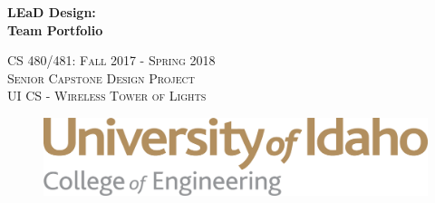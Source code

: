 \documentclass[12pt]{article}
\begin{document}
	\begin{titlepage}
		\centering	
    
    \begin{figure}[h]
      \centering
    \end{figure} 
  
  {\huge\bfseries LEaD Design: \\ Team Portfolio\par}
    
    \title{}
    \date{\vspace{-5ex}} %
    \author{%
    	\\Contributor\\
    	\and {}\\Contributor\\
    	\and \\ \\Contributor\\
    	\and \\ \\Contributor\\
    }
    \let\newpage\relax\maketitle %
    \maketitle		
    
    \vspace{2cm} 
    
    {\scshape\Large 
      CS 480/481: Fall 2017 - Spring 2018 \\
      Senior Capstone Design Project \\ 
      UI CS - Wireless Tower of Lights
      \par}
    
     \vspace{7cm} 
    
    \begin{figure}[h]
      \centering
      \includegraphics[width=0.7\linewidth]{assets/uislogan.png}
    \end{figure} 
  
		\vfill		
	\end{titlepage}
\end{document}
